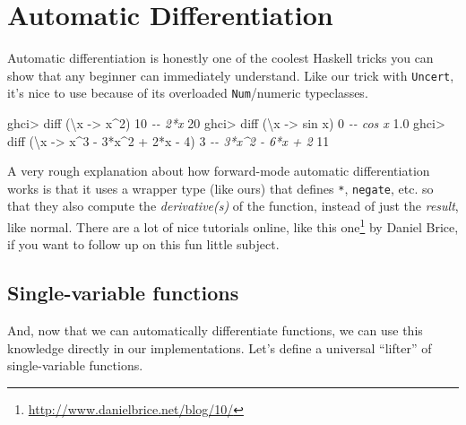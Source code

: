 \documentclass[]{article}
\newenvironment{Shaded}{}{}
\newcommand{\CommentTok}[1]{\textcolor[rgb]{0.38,0.63,0.69}{\textit{#1}}}
\newcommand{\DecValTok}[1]{\textcolor[rgb]{0.25,0.63,0.44}{#1}}
\newcommand{\FloatTok}[1]{\textcolor[rgb]{0.25,0.63,0.44}{#1}}
\newcommand{\FunctionTok}[1]{\textcolor[rgb]{0.02,0.16,0.49}{#1}}
\newcommand{\NormalTok}[1]{#1}
\newcommand{\OperatorTok}[1]{\textcolor[rgb]{0.40,0.40,0.40}{#1}}
\newcommand{\OtherTok}[1]{\textcolor[rgb]{0.00,0.44,0.13}{#1}}
\renewcommand{\href}[2]{#2\footnote{\url{#1}}}
\begin{document}
\hypertarget{automatic-differentiation}{%
\section{Automatic Differentiation}\label{automatic-differentiation}}

Automatic differentiation is honestly one of the coolest Haskell tricks you can
show that any beginner can immediately understand. Like our trick with
\texttt{Uncert}, it's nice to use because of its overloaded \texttt{Num}/numeric
typeclasses.

\begin{Shaded}
\begin{Highlighting}[]
\NormalTok{ghci}\OperatorTok{>}\NormalTok{ diff (\textbackslash{}x }\OtherTok{{-}>}\NormalTok{ x}\OperatorTok{\^{}}\DecValTok{2}\NormalTok{) }\DecValTok{10}       \CommentTok{{-}{-} 2*x}
\DecValTok{20}
\NormalTok{ghci}\OperatorTok{>}\NormalTok{ diff (\textbackslash{}x }\OtherTok{{-}>} \FunctionTok{sin}\NormalTok{ x) }\DecValTok{0}      \CommentTok{{-}{-} cos x}
\FloatTok{1.0}
\NormalTok{ghci}\OperatorTok{>}\NormalTok{ diff (\textbackslash{}x }\OtherTok{{-}>}\NormalTok{ x}\OperatorTok{\^{}}\DecValTok{3} \OperatorTok{{-}} \DecValTok{3}\OperatorTok{*}\NormalTok{x}\OperatorTok{\^{}}\DecValTok{2} \OperatorTok{+} \DecValTok{2}\OperatorTok{*}\NormalTok{x }\OperatorTok{{-}} \DecValTok{4}\NormalTok{) }\DecValTok{3}  \CommentTok{{-}{-} 3*x\^{}2 {-} 6*x + 2}
\DecValTok{11}
\end{Highlighting}
\end{Shaded}

A very rough explanation about how forward-mode automatic differentiation works
is that it uses a wrapper type (like ours) that defines \texttt{*},
\texttt{negate}, etc. so that they also compute the \emph{derivative(s)} of the
function, instead of just the \emph{result}, like normal. There are a lot of
nice tutorials online, like \href{http://www.danielbrice.net/blog/10/}{this one}
by Daniel Brice, if you want to follow up on this fun little subject.

\hypertarget{single-variable-functions}{%
\subsection{Single-variable functions}\label{single-variable-functions}}

And, now that we can automatically differentiate functions, we can use this
knowledge directly in our implementations. Let's define a universal ``lifter''
of single-variable functions.
\end{document}

